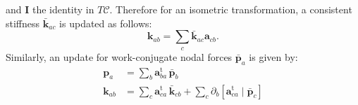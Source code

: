 and \(\bm{I}\) the identity in \(T \mathscr{C}\).
Therefore for an isometric transformation, a consistent stiffness \(\bar{\mathbf{k}}_{a c}\) is updated as follows:
\begin{equation}
  \mathbf{k}_{ab} = \sum_{c} \bar{\mathbf{k}}_{a c} \mathbf{a}_{c b}.
  \label{eq:adapt-petr-isom}
\end{equation}
Similarly, an update for work-conjugate nodal forces \(\bar{\bm{p}}_a\) is given by:
\begin{equation}
  \begin{aligned}
  \bm{p}_a &= \sum_{b} \mathbf{a}_{b a}^{\mathrm{t}} \, \bar{\bm{p}}_{b}^{} \\
  \mathbf{k}_{ab} 
      &= \sum_{c} \mathbf{a}_{c a}^{\mathrm{t}} \, \bar{\mathbf{k}}_{cb}^{}
                   + \sum_{c} \partial_b^{} \left[\mathbf{a}_{c a}^{\mathrm{t}}\mid\bar{\bm{p}}_c^{}
                   \right]
  \end{aligned}
  \label{eq:adapt-isom-bubn}
\end{equation}

